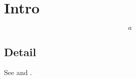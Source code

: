 \documentclass[twocolumn,unicode]{wrapper}
\begin{document}
\wrapperclass\articleclass\layoutmode\hypermode
\section{Intro}\label{sec:intro}
\begin{equation}\label{eq:first}a\end{equation}
\subsection{Detail}\label{sub:detail}
See  and .
\end{document}
